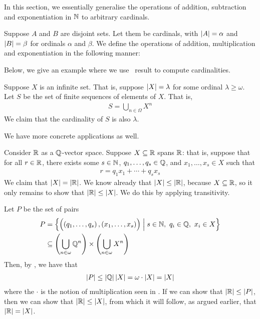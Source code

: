 In this section, we essentially generalise the operations of addition, subtraction and exponentiation in $\mathbb{N}$ to arbitrary cardinals.

\begin{boxdefinition}\label{Ch3:Def:CardArith}
    Suppose $A$ and $B$ are disjoint sets. Let them be cardinals, with $\left\lvert A \right\rvert = \alpha$ and $\left\lvert B \right\rvert = \beta$ for ordinals $\alpha$ and $\beta$. We define the operations of addition, multiplication and exponentiation in the following manner:
    \sorry
\end{boxdefinition}

\sorry

Below, we give an example where we use \sorry\ result to compute cardinalities.

\begin{boxexample}
    Suppose $X$ is an infinite set. That is, suppose $\left\lvert X \right\rvert = \lambda$ for some ordinal $\lambda \geq \omega$. Let $S$ be the set of finite sequences of elements of $X$. That is,
    \begin{align*}
        S = \bigcup_{n \in \Omega}X^n
    \end{align*}
    We claim that the cardinality of $S$ is also $\lambda$.
\end{boxexample}

We have more concrete applications as well.

\begin{boxexample}[Showing that $\dim_{\Q}\of{\R} = \abs{\R}$]
    Consider $\mathbb{R}$ as a $\mathbb{Q}$-vector space. Suppose $X \subseteq \mathbb{R}$ spans $\mathbb{R}$: that is, suppose that for all $r \in \mathbb{R}$, there exists some $s \in \mathbb{N}$, $q_1, \ldots, q_s \in \mathbb{Q}$, and $x_1, \ldots, x_s \in X$ such that
    \begin{align*}
        r = q_1 x_1 + \cdots + q_s x_s
    \end{align*}
    We claim that $\left\lvert X \right\rvert = \left\lvert \mathbb{R} \right\rvert$. We know already that $\left\lvert X \right\rvert \leq \left\lvert \mathbb{R} \right\rvert$, because $X \subseteq \mathbb{R}$, so it only remains to show that $\left\lvert \mathbb{R} \right\rvert \leq \left\lvert X \right\rvert$. We do this by applying transitivity. \newline

    Let $P$ be the set of pairs
    \begin{align*}
        P &= \left\{ \Big({\left( q_1, \ldots, q_s \right), \left( x_1, \ldots, x_s \right)}\Big) \; \middle\vert \; s \in \mathbb{N}, \ q_i \in \mathbb{Q}, \ x_i \in X \right\} \\
        &\subseteq \left( \bigcup_{n \in \omega} \mathbb{Q}^n \right) \times \left( \bigcup_{n \in \omega} X^n \right)
    \end{align*}
    Then, by \sorry, we have that
    \begin{align*}
        \left\lvert P \right\rvert \leq \left\lvert \mathbb{Q} \right\rvert\left\lvert X \right\rvert = \omega \cdot \left\lvert X \right\rvert = \left\lvert X \right\rvert
    \end{align*}
    where the $\cdot$ is the notion of multiplication seen in . If we can show that $\left\lvert \mathbb{R} \right\rvert \leq \left\lvert P \right\rvert$, then we can show that $\left\lvert \mathbb{R} \right\rvert \leq \left\lvert X \right\rvert$, from which it will follow, as argued earlier, that $\left\lvert \mathbb{R} \right\rvert = \left\lvert X \right\rvert$. \sorry
\end{boxexample}

